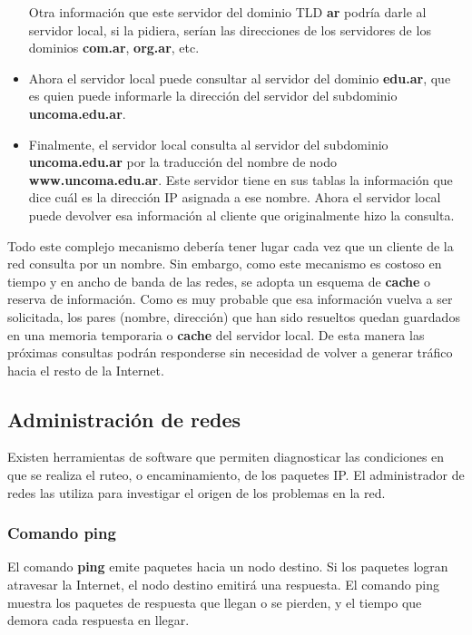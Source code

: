 \documentclass[spanish,a4paper,]{article}
\begin{document}
\begin{itemize}
  Otra información que este servidor del dominio TLD \textbf{ar} podría
  darle al servidor local, si la pidiera, serían las direcciones de los
  servidores de los dominios \textbf{com.ar}, \textbf{org.ar}, etc.
\item
  Ahora el servidor local puede consultar al servidor del dominio
  \textbf{edu.ar}, que es quien puede informarle la dirección del
  servidor del subdominio \textbf{uncoma.edu.ar}.
\item
  Finalmente, el servidor local consulta al servidor del subdominio
  \textbf{uncoma.edu.ar} por la traducción del nombre de nodo
  \textbf{www.uncoma.edu.ar}. Este servidor tiene en sus tablas la
  información que dice cuál es la dirección IP asignada a ese nombre.
  Ahora el servidor local puede devolver esa información al cliente que
  originalmente hizo la consulta.
\end{itemize}

Todo este complejo mecanismo debería tener lugar cada vez que un cliente
de la red consulta por un nombre. Sin embargo, como este mecanismo es
costoso en tiempo y en ancho de banda de las redes, se adopta un esquema
de \textbf{cache} o reserva de información. Como es muy probable que esa
información vuelva a ser solicitada, los pares (nombre, dirección) que
han sido resueltos quedan guardados en una memoria temporaria o
\textbf{cache} del servidor local. De esta manera las próximas consultas
podrán responderse sin necesidad de volver a generar tráfico hacia el
resto de la Internet.

\hypertarget{administraciuxf3n-de-redes}{%
\subsection{Administración de redes}\label{administraciuxf3n-de-redes}}

Existen herramientas de software que permiten diagnosticar las
condiciones en que se realiza el ruteo, o encaminamiento, de los
paquetes IP. El administrador de redes las utiliza para investigar el
origen de los problemas en la red.

\hypertarget{comando-ping}{%
\subsubsection{Comando ping}\label{comando-ping}}

El comando \textbf{ping} emite paquetes hacia un nodo destino. Si los
paquetes logran atravesar la Internet, el nodo destino emitirá una
respuesta. El comando ping muestra los paquetes de respuesta que llegan
o se pierden, y el tiempo que demora cada respuesta en llegar.
\end{document}

